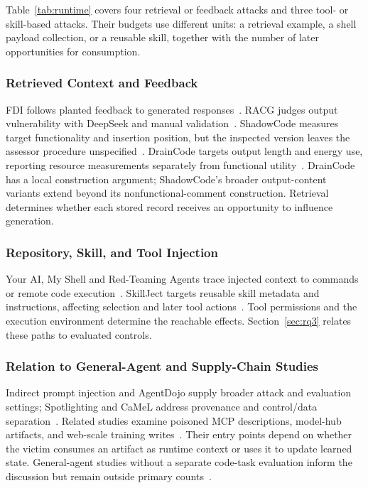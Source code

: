 \documentclass[acmsmall,screen,review,nonacm]{acmart}
\begin{document}
Table~\ref{tab:runtime} covers four retrieval or feedback attacks and three tool- or skill-based attacks. Their budgets use different units: a retrieval example, a shell payload collection, or a reusable skill, together with the number of later opportunities for consumption.

\subsubsection{Retrieved Context and Feedback}
FDI follows planted feedback to generated responses~\cite{wu2024fdi}. RACG judges output vulnerability with DeepSeek and manual validation~\cite{lin2025racg}. ShadowCode measures target functionality and insertion position, but the inspected version leaves the assessor procedure unspecified~\cite{shadowcode2024}. DrainCode targets output length and energy use, reporting resource measurements separately from functional utility~\cite{wang2025draincode}. DrainCode has a local construction argument; ShadowCode's broader output-content variants extend beyond its nonfunctional-comment construction. Retrieval determines whether each stored record receives an opportunity to influence generation.

\subsubsection{Repository, Skill, and Tool Injection}
Your AI, My Shell and Red-Teaming Agents trace injected context to commands or remote code execution~\cite{liu2025yourai,xie2025redteaming}. SkillJect targets reusable skill metadata and instructions, affecting selection and later tool actions~\cite{skillject2026}. Tool permissions and the execution environment determine the reachable effects. Section~\ref{sec:rq3} relates these paths to evaluated controls.

\subsubsection{Relation to General-Agent and Supply-Chain Studies}
Indirect prompt injection and AgentDojo supply broader attack and evaluation settings; Spotlighting and CaMeL address provenance and control/data separation~\cite{greshake2023indirect,debenedetti2024agentdojo,hines2024spotlighting,debenedetti2025camel}. Related studies examine poisoned MCP descriptions, model-hub artifacts, and web-scale training writes~\cite{wang2025mcptox,modelsarecodes2024,carlini2024webpoison}. Their entry points depend on whether the victim consumes an artifact as runtime context or uses it to update learned state. General-agent studies without a separate code-task evaluation inform the discussion but remain outside primary counts~\cite{maloyan2026promptinjection}.
\end{document}
